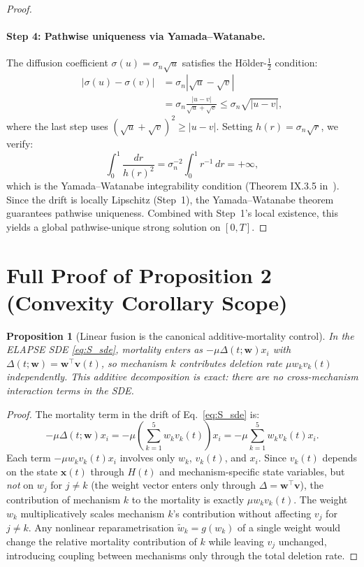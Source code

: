 \documentclass[review,12pt]{elsarticle}
\newcommand{\bfx}{\mathbf{x}}
\newcommand{\bfw}{\mathbf{w}}
\newcommand{\bfv}{\mathbf{v}}
\newtheorem{proposition}[theorem]{Proposition}
\begin{document}
\begin{proof}
\paragraph{Step 4: Pathwise uniqueness via Yamada--Watanabe.}
The diffusion coefficient $\sigma(u) = \sigma_n\sqrt{u}$ satisfies
the H\"{o}lder-$\frac{1}{2}$ condition:
\begin{align*}
  |\sigma(u) - \sigma(v)| &= \sigma_n|\sqrt{u} - \sqrt{v}| \\
  &= \sigma_n \frac{|u - v|}{\sqrt{u} + \sqrt{v}}
   \leq \sigma_n \sqrt{|u - v|},
\end{align*}
where the last step uses $(\sqrt{u} + \sqrt{v})^2 \geq |u - v|$.
Setting $h(r) = \sigma_n\sqrt{r}$, we verify:
\[
  \int_0^1 \frac{dr}{h(r)^2} = \sigma_n^{-2}\int_0^1 r^{-1}\,dr = +\infty,
\]
which is the Yamada--Watanabe integrability condition
(Theorem IX.3.5 in~\cite{revuzyor1999}).  Since the drift is locally
Lipschitz (Step~1), the Yamada--Watanabe theorem guarantees pathwise
uniqueness.  Combined with Step~1's local existence, this yields a
global pathwise-unique strong solution on $[0,T]$.
\end{proof}

\section{Full Proof of Proposition 2 (Convexity Corollary Scope)}
\label{sec:S_prop2}

\begin{proposition}[Linear fusion is the canonical additive-mortality control]
\label{prop:S_fusion}
In the ELAPSE SDE \eqref{eq:S_sde}, mortality enters as
$-\mu\Delta(t;\bfw)x_i$ with $\Delta(t;\bfw) = \bfw^\top\bfv(t)$,
so mechanism $k$ contributes deletion rate $\mu w_k v_k(t)$ independently.
This additive decomposition is exact: there are no cross-mechanism
interaction terms in the SDE.
\end{proposition}

\begin{proof}
The mortality term in the drift of Eq.~\eqref{eq:S_sde} is:
\[
  -\mu\Delta(t;\bfw)x_i = -\mu\left(\sum_{k=1}^5 w_k v_k(t)\right)x_i
  = -\mu\sum_{k=1}^5 w_k v_k(t) x_i.
\]
Each term $-\mu w_k v_k(t) x_i$ involves only $w_k$, $v_k(t)$,
and $x_i$.  Since $v_k(t)$ depends on the state $\bfx(t)$ through $H(t)$
and mechanism-specific state variables, but \emph{not} on $w_{j}$ for
$j \neq k$ (the weight vector enters only through $\Delta = \bfw^\top\bfv$),
the contribution of mechanism $k$ to the mortality is exactly $\mu w_k v_k(t)$.
The weight $w_k$ multiplicatively scales mechanism $k$'s contribution
without affecting $v_j$ for $j \neq k$.  Any nonlinear reparametrisation
$\tilde{w}_k = g(w_k)$ of a single weight would change the relative
mortality contribution of $k$ while leaving $v_j$ unchanged, introducing
coupling between mechanisms only through the total deletion rate.
\end{proof}
\end{document}
